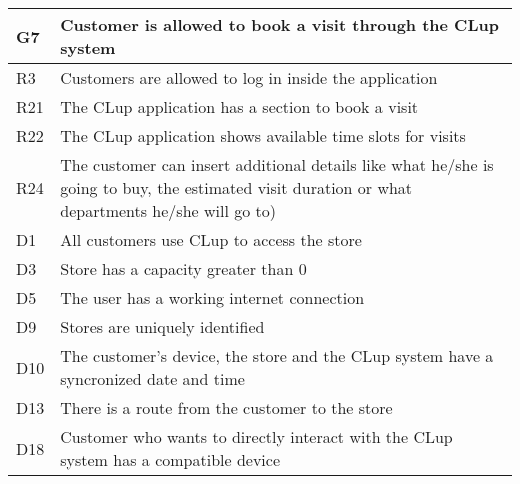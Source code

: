 \begin{center}
        {\renewcommand{\arraystretch}{1.5}
        \begin{longtable}{L{2cm}L{12cm}}
            \hline
            \textbf{G7} & \textbf{Customer is allowed to book a visit through the CLup system} \\
            \hline
             R3 & Customers are allowed to log in inside the application \\
            \hline
             R21 & The CLup application has a section to book a visit \\
            \hline
             R22 & The CLup application shows available time slots for visits \\
            \hline
             R24 & The customer can insert additional details like what he/she is going to buy, the estimated visit duration or what departments he/she will go to) \\
            \hline
             D1 & All customers use CLup to access the store \\
            \hline
             D3 & Store has a capacity greater than 0 \\
            \hline
             D5 & The user has a working internet connection \\
            \hline
             D9 & Stores are uniquely identified \\
            \hline
             D10 & The customer’s device, the store and the CLup system have a syncronized date and time \\
            \hline
             D13 & There is a route from the customer to the store \\
            \hline
             D18 & Customer who wants to directly interact with the CLup system has a compatible device \\
            \hline
        \end{longtable}}


\end{center}

